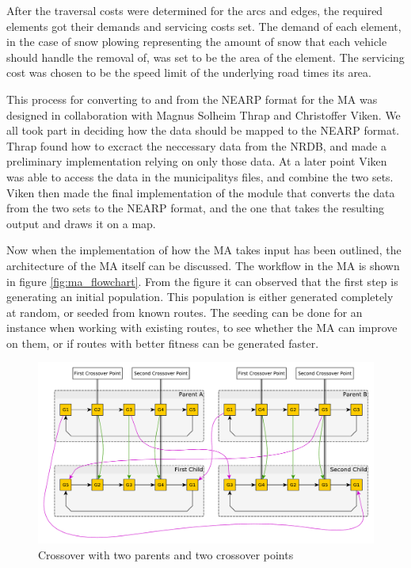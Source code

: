 After the traversal costs were determined for the arcs and edges, the required elements got their demands and servicing costs set. The demand of each element, in the case of snow plowing representing the amount of snow that each vehicle should handle the removal of, was set to be the area of the element. The servicing cost was chosen to be the speed limit of the underlying road times its area.

This process for converting to and from the NEARP format for the MA was designed in collaboration with Magnus Solheim Thrap and Christoffer Viken. We all took part in deciding how the data should be mapped to the NEARP format. Thrap found how to excract the neccessary data from the NRDB, and made a preliminary implementation relying on only those data. At a later point Viken was able to access the data in the municipalitys files, and combine the two sets. Viken then made the final implementation of the module that converts the data from the two sets to the NEARP format, and the one that takes the resulting output and draws it on a map.

Now when the implementation of how the MA takes input has been outlined, the architecture of the MA itself can be discussed. The workflow in the MA is shown in figure \ref{fig:ma_flowchart}. From the figure it can observed that the first step is generating an initial population. This population is either generated completely at random, or seeded from known routes. The seeding can be done for an instance when working with existing routes, to see whether the MA can improve on them, or if routes with better fitness can be generated faster.

\begin{figure}[thbp]
	\centerline{\includegraphics[width=\textwidth]{figures/Architecture/Crossover_Illustration.pdf}}
	\caption{Crossover with two parents and two crossover points}
	\label{fig:crossover_illustration}
\end{figure}

